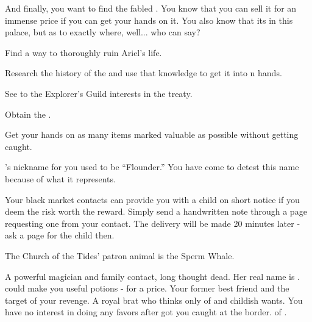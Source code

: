 \documentclass[char]{NeptuneBall}
\begin{document}
And finally, you want to find the fabled \iGlowShell{\MYname}. You know that you can sell it for an immense price if you can get your hands on it. You also know that its in this palace, but as to exactly where, well... who can say?

\begin{itemz}[Goals]
  \item Find a way to thoroughly ruin Ariel's life.
	\item Research the history of the \pGazaStrip{} and use that knowledge to get it into \pAtlantis{}n hands.
	\item See to the Explorer's Guild interests in the treaty.
	\item Obtain the \iGlowShell{}.
	\item Get your hands on as many items marked valuable as possible without getting caught.
\end{itemz}

\begin{itemz}[Notes]
	\item \cAriel{}'s nickname for you used to be ``Flounder.'' You have come to detest this name because of what it represents.
  \item Your black market contacts can provide you with a child on short notice if you deem the risk worth the reward. Simply send a handwritten note through a page requesting one from your contact. The delivery will be made 20 minutes later - ask a page for the child then. 
\end{itemz}

\begin{itemz}[Trivia]
  \item The Church of the Tides' patron animal is the Sperm Whale.
\end{itemz}

\begin{contacts}
  \contact{\cWitch{}} A powerful magician and family contact, long thought dead. Her real name is \cWitch{}. \cWitch{\They} could make you useful potions - for a price.
  \contact{\cAriel{}} Your former best friend and the target of your revenge.
  \contact{\cPrincess{}} A royal brat who thinks only of \cPrincess{\themself} and \cPrincess{\their} childish wants. You have no interest in doing \cPrincess{\them} any favors after \cPrincess{\they} got you caught at the border.
  \contact{\cKing{}} \cKing{\King} of \pAtlantis{}. 
\end{contacts}
\end{document}
